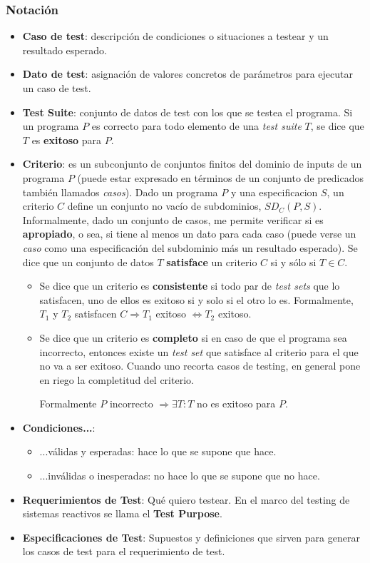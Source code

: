 \documentclass[]{article}
\begin{document}
\subsubsection{Notación}
\begin{itemize}
	\item \textbf{Caso de test}: descripción de condiciones o situaciones a testear y un resultado esperado.
	\item \textbf{Dato de test}: asignación de valores concretos de parámetros para ejecutar un caso de test.
	\item \textbf{Test Suite}: conjunto de datos de test con los que se testea el programa. Si un programa $P$ es correcto para todo elemento de una \textit{test suite} $T$, se dice que $T$ es \textbf{exitoso} para $P$.
	\item \textbf{Criterio}: es un subconjunto de conjuntos finitos del dominio de inputs de un programa $P$ (puede estar expresado en términos de un conjunto de predicados también llamados \textit{casos}). Dado un programa $P$ y una especificacion $S$, un criterio $C$ define un conjunto no vacío de subdominios, $SD_C (P,S)$. Informalmente, dado un conjunto de casos, me permite verificar si es \textbf{apropiado}, o sea, si tiene al menos un dato para cada caso (puede verse un \textit{caso} como una especificación del subdominio más un resultado esperado).
	Se dice que un conjunto de datos $T$ \textbf{satisface} un criterio $C$ si y sólo si $T\in C$.
	\begin{itemize}
		\item Se dice que un criterio es \textbf{consistente} si todo par de \textit{test sets} que lo satisfacen, uno de ellos es exitoso si y solo si el otro lo es. Formalmente, $T_1$ y $T_2$ satisfacen $C \Rightarrow T_1$ exitoso $\Leftrightarrow T_2$ exitoso.
		\item Se dice que un criterio es \textbf{completo} si en caso de que el programa sea incorrecto, entonces existe un \textit{test set} que satisface al criterio para el que no va a ser exitoso. Cuando uno recorta casos de testing, en general pone en riego la completitud del criterio.

		Formalmente $P$ incorrecto $\Rightarrow \exists T : T$ no es exitoso para $P$.
	\end{itemize}
	\item \textbf{Condiciones...}:
	\begin{itemize}
		\item ...válidas y esperadas: hace lo que se supone que hace.
		\item ...inválidas o inesperadas: no hace lo que se supone que no hace.
	\end{itemize}
	\item \textbf{Requerimientos de Test}: Qué quiero testear. En el marco del testing de sistemas reactivos se llama el \textbf{Test Purpose}.
	\item \textbf{Especificaciones de Test}: Supuestos y definiciones que sirven para generar los casos de test para el requerimiento de test.
\end{itemize}
\end{document}
